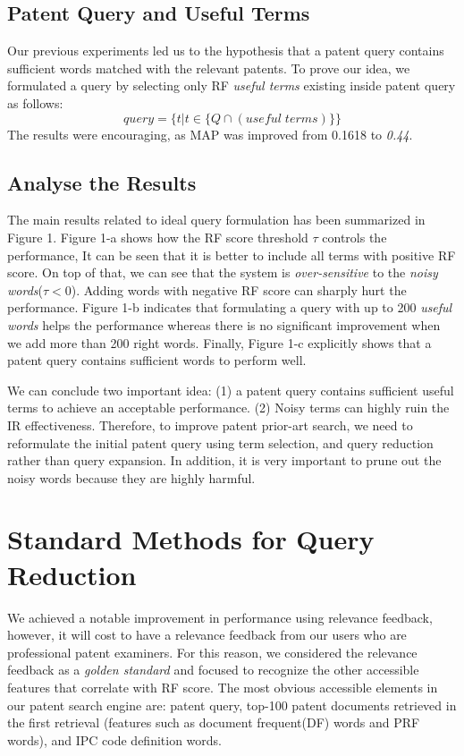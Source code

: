 \documentclass{sig-alternate}
\begin{document}
\subsection{Patent Query and Useful Terms}
Our previous experiments led us to the hypothesis that a patent query contains sufficient words matched with the relevant patents.
To prove our idea, we formulated a query by selecting only RF {\em useful terms} existing inside patent query as follows: 
\begin{equation}
 query = \{t|t \in \{ Q\cap (useful \; terms)\}\}   
 \label{eq:score}
\end{equation}
The results were encouraging, as MAP was improved from 0.1618 to {\em 0.44}.
\subsection{Analyse the Results}
The main results related to ideal query formulation has been summarized in Figure 1. Figure 1-a shows how the RF score threshold $\tau$ controls the performance, It can be seen that it is better to include all terms with positive RF score. On top of that, we can see that the system is {\em over-sensitive} to the {\em noisy words}($ \tau<0 $). Adding words with negative RF score can sharply hurt the performance. Figure 1-b indicates that formulating a query with up to 200 {\em useful words} helps the performance whereas there is no significant improvement when we add more than 200 right words. Finally, Figure 1-c explicitly shows that a patent query contains sufficient words to perform well. 
 
We can conclude two important idea: (1) a patent query contains sufficient useful terms to achieve an acceptable performance. (2) Noisy terms can highly ruin the IR effectiveness. Therefore, to improve patent prior-art search, we need to reformulate the initial patent query using term selection, and query reduction rather than query expansion. In addition, it is very important to prune out the noisy words because they are highly harmful.  

\section{Standard Methods for Query Reduction}
We achieved a notable improvement in performance using relevance feedback, however, it will cost to have a relevance feedback from our users who are professional patent examiners. For this reason, we considered the relevance feedback as a {\em golden standard} and focused to recognize the other accessible features that correlate with RF score. The most obvious accessible elements in our patent search engine are: patent query, top-100 patent documents retrieved in the first retrieval (features such as document frequent(DF) words and PRF words), and IPC code definition words.  
\end{document}
